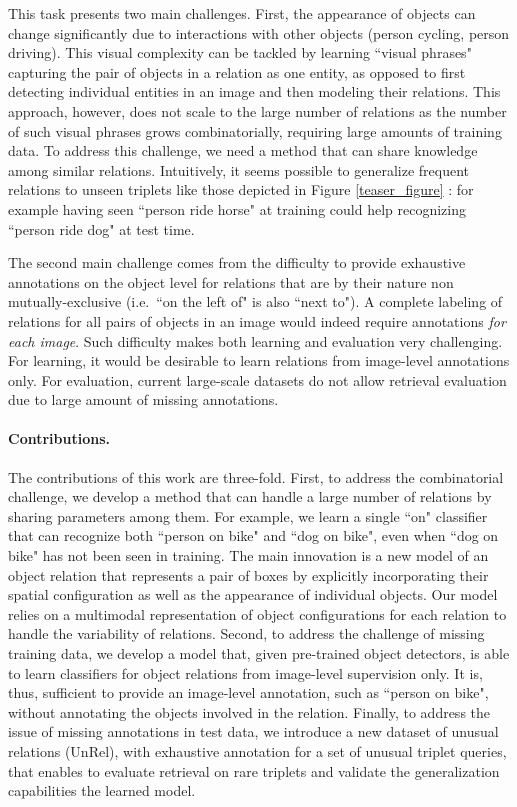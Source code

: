 \documentclass[10pt,twocolumn,letterpaper]{article}
\newcommand{\spaceparagraph}{\vspace{-.35cm}}
\newcommand{\gotoline}{\vspace{.05cm}}
\begin{document}
\gotoline
\vspace{4pt}
This task presents two main challenges. 
First, the appearance of objects can change significantly due to interactions with other objects (person cycling, person driving).
This visual complexity can be tackled by learning ``visual phrases"~\cite{Sadeghi2011} capturing the pair
of objects in a relation as one entity, as opposed to first detecting individual entities in an image and then modeling their relations. 
This approach, however, does not scale to the large number of relations as the number of such visual phrases grows combinatorially, requiring large amounts of training data.
To address this challenge, we need a method that can share knowledge among similar relations.
Intuitively, it seems possible to generalize frequent relations to unseen triplets like those depicted in Figure \ref{teaser_figure} : for example having seen ``person ride horse" at training could help recognizing ``person ride dog" at test time.

\gotoline
The second main challenge comes from the difficulty to provide exhaustive annotations on the object level for relations that are by their nature non mutually-exclusive (i.e.\ ``on the left of" is also ``next to"). A complete labeling of  relations for all pairs of  objects in an image would indeed require  annotations {\em for each image}. Such difficulty makes both learning and evaluation very challenging. For learning, it would be desirable to learn relations from image-level annotations only. For evaluation, current large-scale datasets \cite{Krishna2016,Lu16} do not allow retrieval evaluation due to large amount of missing annotations. 

\spaceparagraph
\paragraph{Contributions.}
The contributions of this work are three-fold. First, to address the combinatorial challenge, we develop a method that can handle a large number of relations by sharing parameters among them. 
For example, we learn  a single ``on" classifier that can recognize
both ``person on bike" and ``dog on bike", even when ``dog on bike" has not been seen in training.  The main innovation is a
new model of an object relation that represents a pair of boxes by
explicitly incorporating their spatial configuration as well as the
appearance of individual objects. 
Our model relies on a multimodal representation of object configurations for each relation to handle the variability of relations. Second, to
address the challenge of missing training data, we develop a model that, given
pre-trained object detectors, is able to learn classifiers for object
relations from image-level supervision only. It is, thus, sufficient 
to provide an image-level annotation, such as  ``person on bike", without
annotating the objects involved in the relation. 
Finally, to address the issue of missing annotations in test data, we introduce a new
dataset of unusual relations (UnRel), with exhaustive annotation for a
set of unusual triplet queries, that enables to evaluate retrieval on
rare triplets and validate the generalization capabilities the learned
model.  
\end{document}
